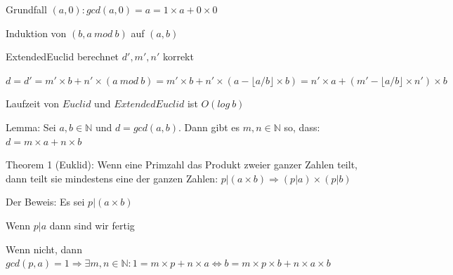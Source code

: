 \documentclass[a4paper]{article}
\begin{document}
\begin{multicols}{3}
\begin{itemize*}
            \begin{itemize*}
                  \item Grundfall $(a,0): gcd(a, 0) = a = 1 \times a + 0 \times 0$
                  \item Induktion von $(b, a\ mod\ b)$ auf $(a, b)$
                  \begin{itemize*}
                        \item ExtendedEuclid berechnet $d', m', n'$ korrekt
                        \item $d=d'=m'\times b+n'\times (a\ mod\ b)=m'\times b+n'\times (a-\lfloor a/b\rfloor\times b)=n'\times a+(m'-\lfloor a/b\rfloor\times n')\times b$
                  \end{itemize*}
                  \item Laufzeit von $Euclid$ und $ExtendedEuclid$ ist $O(log\ b)$
            \end{itemize*}
            \item Lemma: Sei $a,b\in\mathbb{N}$ und $d=gcd(a,b)$. Dann gibt es $m,n\in\mathbb{N}$ so, dass: $d=m\times a+n \times b$
            \item Theorem 1 (Euklid): Wenn eine Primzahl das Produkt zweier ganzer Zahlen teilt, dann teilt sie mindestens eine der ganzen Zahlen: $p|(a\times b)\Rightarrow (p| a)\times(p| b)$
            \begin{itemize*}
                  \item Der Beweis: Es sei $p|(a\times b)$
                  \item Wenn $p| a$ dann sind wir fertig
                  \item Wenn nicht, dann $gcd(p,a) = 1 \Rightarrow\exists m, n\in\mathbb{N}:1=m\times p+n\times a \Leftrightarrow b=m\times p \times b + n \times a \times b$

\end{itemize*}
\end{itemize*}
\end{multicols}
\end{document}
